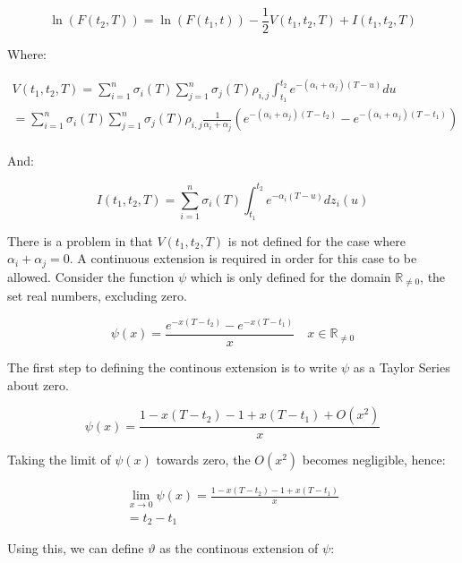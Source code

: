 \documentclass{article}
\begin{document}
\begin{equation}
    \ln(F(t_2, T)) = \ln(F(t_1, t)) - \frac{1}{2} V(t_1, t_2, T) + I(t_1, t_2, T)
\end{equation}

Where:

\begin{eqnarray}
    \label{eq:forward_drift_adjust}
    \nonumber
    V(t_1, t_2, T) =  \sum_{i=1}^n \sigma_i(T) \sum_{j=1}^n 
    \sigma_j(T) \rho_{i,j} \int_{t_1}^{t_2} e^{-(\alpha_i + \alpha_j)(T-u)} du\\
    = \sum_{i=1}^n \sigma_i(T) \sum_{j=1}^n \sigma_j(T) \rho_{i,j} 
    \frac{1}{\alpha_i + \alpha_j} (e^{-(\alpha_i + \alpha_j)(T-t_2)} - 
    e^{-(\alpha_i + \alpha_j)(T-t_1)}) \\
    \nonumber
\end{eqnarray}

And:

\begin{equation}
    I(t_1, t_2, T) = \sum_{i=1}^n \sigma_i(T) \int_{t_1}^{t_2} e^{-\alpha_i(T-u)}dz_i(u)
\end{equation}

\bigskip
There is a problem in that $V(t_1, t_2, T)$ is not defined for the case where 
$\alpha_i + \alpha_j = 0$. A continuous extension is required in order for this
case to be allowed. Consider the function $\psi$ which is only defined for 
the domain $\mathbb{R}_{\ne 0}$, the set real numbers, excluding zero.

\begin{equation}
    \psi(x) = \frac{e^{-x(T-t_2)} - e^{-x(T-t_1)}}{x} \quad  x \in \mathbb{R}_{\ne 0}
\end{equation}

The first step to defining the continous extension is to write $\psi$ as a Taylor Series
about zero.

\begin{equation}
    \psi(x) = \frac{1 - x(T-t_2) - 1 + x(T - t_1) + O(x^2)}{x}
\end{equation}

Taking the limit of $\psi(x)$ towards zero, the $O(x^2)$ becomes negligible, hence:

\begin{eqnarray}
    \nonumber
    \lim_{x \to 0} \psi(x) = \frac{1 - x(T-t_2) - 1 + x(T - t_1)}{x} \\
    = t_2 - t_1
\end{eqnarray}

Using this, we can define $\vartheta$ as the continous extension of $\psi$:
\end{document}
